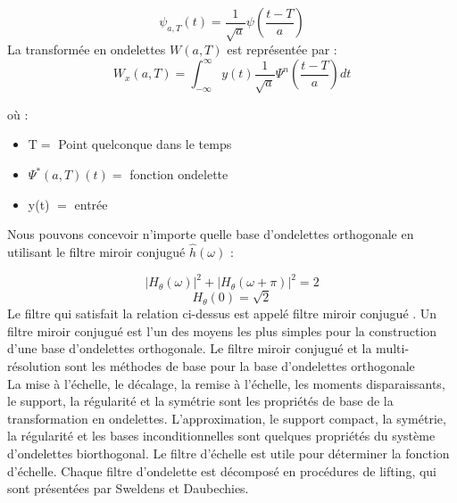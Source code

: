 \begin{equation}\psi_{a,T}(t) = \frac{1}{\sqrt{a}}\psi \left(\frac{t - T}{a}\right) \end{equation}
La transformée en ondelettes $W(a, T)$ est représentée par :
\begin{equation}
    W_{x}(a,T) = \int_{-\infty}^{\infty}y(t)\frac{1}{\sqrt{a}}\Psi^{n}\left(\frac{t - T}{a}\right)dt 
    \label{eq:wt_func}
\end{equation}

où :
\begin{itemize}
    \item[-] \(\mathrm{T} =\) Point quelconque dans le temps
    \item[-] \(\Psi^{*}(a,T)(t) =\) fonction ondelette
    \item[-] y(t) \(=\) entrée
\end{itemize}
Nous pouvons concevoir n'importe quelle base d'ondelettes orthogonale en utilisant le filtre miroir conjugué \(\hat{h} (\omega)\) :

\begin{equation}
    \left|H_{\theta}(\omega)\right|^{2} + \left|H_{\theta}(\omega +\pi)\right|^{2} = 2
    \label{eq:mirror_filter}
\end{equation}
\begin{equation}
    H_{\theta}(0) = \sqrt{2} 
    \label{eq:mirror_filter_zero}
\end{equation}
Le filtre qui satisfait la relation ci-dessus est appelé filtre miroir conjugué \cite{19}. Un filtre miroir conjugué est l'un des moyens les plus simples pour la construction d'une base d'ondelettes orthogonale. Le filtre miroir conjugué et la multi-résolution sont les méthodes de base pour la base d'ondelettes orthogonale \cite{20}\\
La mise à l'échelle, le décalage, la remise à l'échelle, les moments disparaissants, le support, la régularité et la symétrie sont les propriétés de base de la transformation en ondelettes. L'approximation, le support compact, la symétrie, la régularité et les bases inconditionnelles sont quelques propriétés du système d'ondelettes biorthogonal. Le filtre d'échelle est utile pour déterminer la fonction d'échelle. Chaque filtre d'ondelette est décomposé en procédures de lifting, qui sont présentées par Sweldens et Daubechies.

